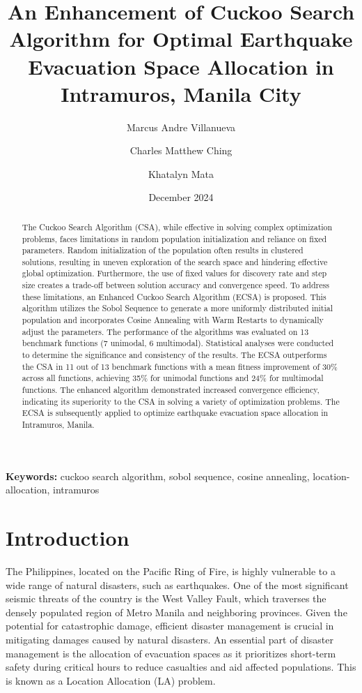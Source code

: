 \documentclass{article}
\title{An Enhancement of Cuckoo Search Algorithm for Optimal Earthquake Evacuation Space Allocation  in Intramuros, Manila City}
\author[1]{Marcus Andre Villanueva}
\author[2]{Charles Matthew Ching}
\author[3]{Khatalyn Mata}
\affil[1,2,3]{Department of Computer Science, Pamantasan ng Lungsod ng Maynila, Manila, Philippines}
\date{December 2024}
\begin{document}
\maketitle

\begin{abstract}
    The Cuckoo Search Algorithm (CSA), while effective in solving complex optimization problems, faces limitations in random population initialization and reliance on fixed parameters. Random initialization of the population often results in clustered solutions, resulting in uneven exploration of the search space and hindering effective global optimization. Furthermore, the use of fixed values for discovery rate and step size creates a trade-off between solution accuracy and convergence speed. To address these limitations, an Enhanced Cuckoo Search Algorithm (ECSA) is proposed. This algorithm utilizes the Sobol Sequence to generate a more uniformly distributed initial population and incorporates Cosine Annealing with Warm Restarts to dynamically adjust the parameters. The performance of the algorithms was evaluated on 13 benchmark functions (7 unimodal, 6 multimodal). Statistical analyses were conducted to determine the significance and consistency of the results. The ECSA outperforms the CSA in 11 out of 13 benchmark functions with a mean fitness improvement of 30\% across all functions, achieving 35\% for unimodal functions and 24\% for multimodal functions. The enhanced algorithm demonstrated increased convergence efficiency, indicating its superiority to the CSA in solving a variety of optimization problems. The ECSA is subsequently applied to optimize earthquake evacuation space allocation in Intramuros, Manila.
\end{abstract}

\textbf{Keywords:} cuckoo search algorithm, sobol sequence, cosine annealing, location-allocation, intramuros

\section{Introduction}

The Philippines, located on the Pacific Ring of Fire, is highly vulnerable to a wide range of natural disasters, such as earthquakes. One of the most significant seismic threats of the country is the West Valley Fault, which traverses the densely populated region of Metro Manila and neighboring provinces. Given the potential for catastrophic damage, efficient disaster management is crucial in mitigating damages caused by natural disasters. An essential part of disaster management is the allocation of evacuation spaces as it prioritizes short-term safety during critical hours to reduce casualties and aid affected populations. This is known as a Location Allocation (LA) problem.
\end{document}
